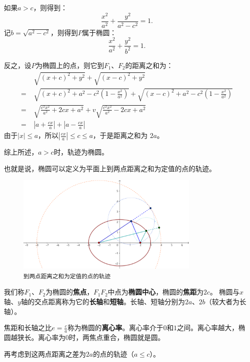 \documentclass[12pt,UTF8]{ctexbook}
\theoremstyle{definition}
\theoremstyle{plain}
\begin{document}
如果$a > c$，则得到：
$$ \frac{x^2}{a^2} + \frac{y^2}{a^2 - c^2} = 1.$$
记$b = \sqrt{a^2 - c^2}$，则得到$P$属于椭圆：
$$ \frac{x^2}{a^2} + \frac{y^2}{b^2} = 1.$$

反之，设$P$为椭圆上的点，则它到$F_1$、$F_2$的距离之和为：
\begin{align*}
    &\;\sqrt{(x + c)^2 + y^2} + \sqrt{(x - c)^2 + y^2}  \\
    =&\;\sqrt{(x + c)^2 + a^2 - c^2\left(1 - \frac{x^2}{a^2}\right)} + \sqrt{(x - c)^2 + a^2 - c^2\left(1 - \frac{x^2}{a^2}\right)} \\
    =&\;\sqrt{\frac{c^2x^2}{a^2} + 2cx + a^2} + v\sqrt{\frac{c^2x^2}{a^2} - 2cx + a^2} \\
    =&\; \left|a + \frac{cx}{a}\right| + \left|a - \frac{cx}{a}\right|
\end{align*}
由于$|x| \leqslant a$，所以$\displaystyle\left|\frac{cx}{a}\right| \leqslant c \leqslant a$，于是距离之和为
$2a$。

综上所述，$a>c$时，轨迹为椭圆。

也就是说，椭圆可以定义为平面上到两点距离之和为定值的点的轨迹。

\begin{figure}[h] 
    \centering
    \includegraphics[width=0.8\textwidth]{tu/椭圆第一定义.png}
    \caption*{\texttt{到两点距离之和为定值的点的轨迹}}
\end{figure}

我们称$F_1$、$F_2$为椭圆的\textbf{焦点}，$F_1F_2$中点为\textbf{椭圆中心}，椭圆的\textbf{焦距}为$2c$。
椭圆与$x$轴、$y$轴的交点距离称为它的\textbf{长轴}和\textbf{短轴}。长轴、短轴分别为$2a$、$2b$（较大者为长轴）。

焦距和长轴之比$\displaystyle e =\frac{c}{a}$称为椭圆的\textbf{离心率}。离心率介于$0$和$1$之间。离心率越大，椭圆越狭长。离心率为$0$时，两焦点重合，椭圆就是圆。

再考虑到这两点距离之差为$2a$的点的轨迹（$a\leqslant c$）。
\end{document}
